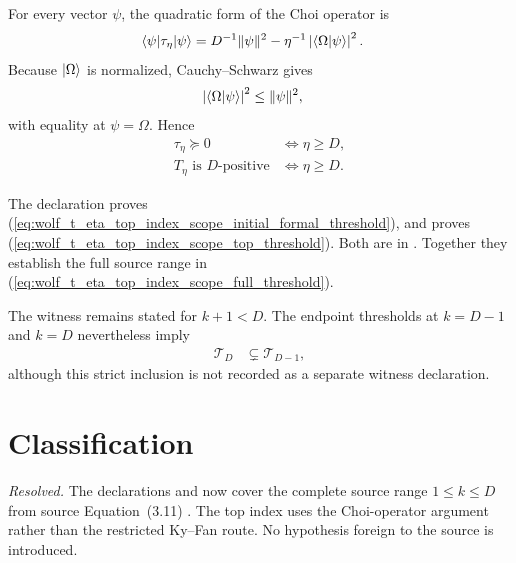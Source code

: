 \documentclass{article}
\begin{document}
For every vector $\psi$, the quadratic form of the Choi operator is
\begin{align}
  \langle \psi|\tau_\eta|\psi\rangle
    &=D^{-1}\|\psi\|^2
      -\eta^{-1}\left|\langle \Omega | \psi \rangle\right|^2.
  \label{eq:wolf_t_eta_top_index_scope_choi_quadratic_form}
\end{align}
Because $|\Omega\rangle$ is normalized, Cauchy--Schwarz gives
\begin{align}
  \left|\langle \Omega | \psi \rangle\right|^2
    &\leq\|\psi\|^2,
  \label{eq:wolf_t_eta_top_index_scope_cauchy_schwarz}
\end{align}
with equality at $\psi=\Omega$. Hence
\begin{align}
  \tau_\eta\succeq0
    &\Longleftrightarrow \eta\geq D,
  \label{eq:wolf_t_eta_top_index_scope_choi_threshold}\\
  T_\eta\text{ is $D$-positive}
    &\Longleftrightarrow \eta\geq D.
  \label{eq:wolf_t_eta_top_index_scope_top_threshold}
\end{align}

The declaration  proves
(\ref{eq:wolf_t_eta_top_index_scope_initial_formal_threshold}), and
 proves
(\ref{eq:wolf_t_eta_top_index_scope_top_threshold}). Both are in
. Together they establish the
full source range in
(\ref{eq:wolf_t_eta_top_index_scope_full_threshold}).

The witness
 remains stated for $k+1<D$.
The endpoint thresholds at $k=D-1$ and $k=D$ nevertheless imply
\begin{align}
  \mathcal T_D
    &\subsetneq\mathcal T_{D-1},
  \label{eq:wolf_t_eta_top_index_scope_strict_top_inclusion}
\end{align}
although this strict inclusion is not recorded as a separate witness
declaration.

\section{Classification}

\emph{Resolved.} The declarations
 and
 now cover the complete source
range $1\leq k\leq D$ from source Equation~(3.11)
\cite[Chapter~3]{Wolf2012Quantum}. The top index uses the Choi-operator
argument rather than the restricted Ky--Fan route. No hypothesis foreign to
the source is introduced.



\end{document}
